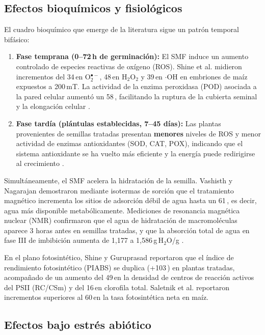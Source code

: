 \subsection{Efectos bioquímicos y fisiológicos}

El cuadro bioquímico que emerge de la literatura sigue un patrón temporal bifásico:

\begin{enumerate}
    \item \textbf{Fase temprana (0--72\,h de germinación):} El SMF induce un aumento controlado de especies reactivas de oxígeno (ROS). Shine et al. \cite{shine_2017} midieron incrementos del 34\,\pct en O$_2^{\bullet-}$, 48\,\pct en H$_2$O$_2$ y 39\,\pct en $\cdot$OH en embriones de maíz expuestos a 200\,mT. La actividad de la enzima peroxidasa (POD) asociada a la pared celular aumentó un 58\,\pct, facilitando la ruptura de la cubierta seminal y la elongación celular \cite{shine_2017, kataria_2017}.
    \item \textbf{Fase tardía (plántulas establecidas, 7--45 días):} Las plantas provenientes de semillas tratadas presentan \textbf{menores} niveles de ROS y menor actividad de enzimas antioxidantes (SOD, CAT, POX), indicando que el sistema antioxidante se ha vuelto más eficiente y la energía puede redirigirse al crecimiento \cite{shine_guruprasad_2012, anand_2012}.
\end{enumerate}

Simultáneamente, el SMF acelera la hidratación de la semilla. Vashisth y Nagarajan \cite{vashisth_nagarajan_2009} demostraron mediante isotermas de sorción que el tratamiento magnético incrementa los sitios de adsorción débil de agua hasta un 61\,\pct, es decir, agua más disponible metabólicamente. Mediciones de resonancia magnética nuclear (NMR) confirmaron que el agua de hidratación de macromoléculas aparece 3 horas antes en semillas tratadas, y que la absorción total de agua en fase III de imbibición aumenta de 1,177 a 1,586\,g\,H$_2$O/g \cite{vashisth_nagarajan_2010}.

En el plano fotosintético, Shine y Guruprasad \cite{shine_guruprasad_2012} reportaron que el índice de rendimiento fotosintético (PIABS) se duplica (+103\,\pct) en plantas tratadas, acompañado de un aumento del 49\,\pct en la densidad de centros de reacción activos del PSII (RC/CSm) y del 16\,\pct en clorofila total. Saletnik et al. \cite{saletnik_2022_static} reportaron incrementos superiores al 60\,\pct en la tasa fotosintética neta en maíz.

\subsection{Efectos bajo estrés abiótico}
\label{subsec:estres_abiotico}

